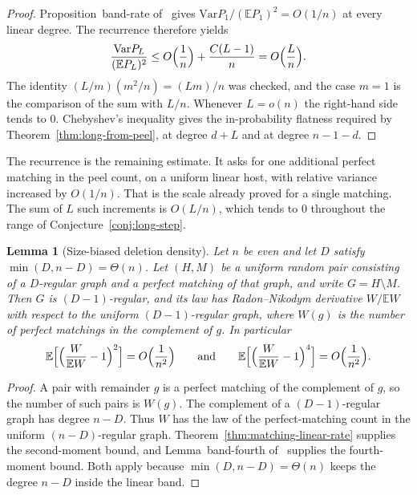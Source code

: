 \documentclass[11pt]{article}
\newtheorem{lemma}[theorem]{Lemma}
\newcommand{\EE}{\mathbb{E}}
\newcommand{\Var}{\mathrm{Var}}
\begin{document}
\begin{proof}
Proposition~band-rate of~\cite{PlusOneV1} gives
\(\Var P_1/(\EE P_1)^2=O(1/n)\) at every linear degree.
The recurrence therefore yields
\[
\frac{\Var P_L}{(\EE P_L)^2}
\le
O\Bigl(\frac1n\Bigr)
+
\frac{C(L-1)}{n}
=
O\Bigl(\frac{L}{n}\Bigr).
\]
The identity \((L/m)(m^2/n)=(Lm)/n\) was checked, and the case \(m=1\) is the
comparison of the sum with \(L/n\).
Whenever \(L=o(n)\) the right-hand side tends to \(0\).
Chebyshev's inequality gives the in-probability flatness required by
Theorem~\ref{thm:long-from-peel}, at degree \(d+L\) and at degree \(n-1-d\).
\end{proof}

The recurrence is the remaining estimate.
It asks for one additional perfect matching in the peel count, on a uniform
linear host, with relative variance increased by \(O(1/n)\).
That is the scale already proved for a single matching.
The sum of \(L\) such increments is \(O(L/n)\), which tends to \(0\) throughout
the range of Conjecture~\ref{conj:long-step}.

\begin{lemma}[Size-biased deletion density]
\label{lem:deletion-density}
Let \(n\) be even and let \(D\) satisfy \(\min(D,n-D)=\Theta(n)\).
Let \((H,M)\) be a uniform random pair consisting of a \(D\)-regular graph and a
perfect matching of that graph, and write \(G=H\setminus M\).
Then \(G\) is \((D-1)\)-regular, and its law has Radon--Nikodym derivative
\(W/\EE W\) with respect to the uniform \((D-1)\)-regular graph, where \(W(g)\) is
the number of perfect matchings in the complement of \(g\).
In particular
\[
\EE\Bigl[\Bigl(\frac{W}{\EE W}-1\Bigr)^2\Bigr]
=
O\Bigl(\frac1{n^2}\Bigr)
\qquad\text{and}\qquad
\EE\Bigl[\Bigl(\frac{W}{\EE W}-1\Bigr)^4\Bigr]
=
O\Bigl(\frac1{n^2}\Bigr).
\]
\end{lemma}

\begin{proof}
A pair with remainder \(g\) is a perfect matching of the complement of \(g\), so
the number of such pairs is \(W(g)\).
The complement of a \((D-1)\)-regular graph has degree \(n-D\).
Thus \(W\) has the law of the perfect-matching count in the uniform
\((n-D)\)-regular graph.
Theorem~\ref{thm:matching-linear-rate} supplies the second-moment bound, and
Lemma~band-fourth of~\cite{PlusOneV1} supplies the fourth-moment bound.
Both apply because \(\min(D,n-D)=\Theta(n)\) keeps the degree \(n-D\) inside
the linear band.
\end{proof}
\end{document}
